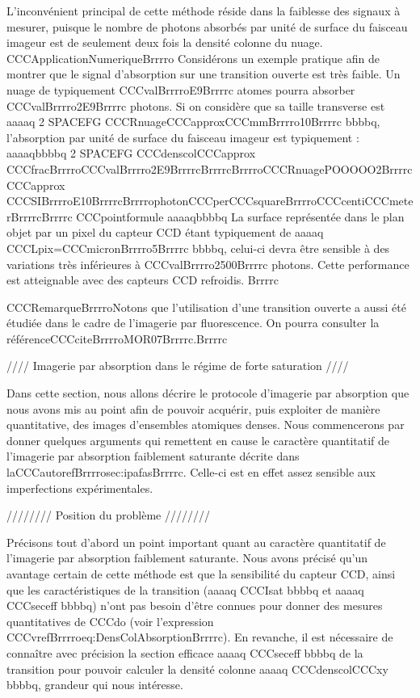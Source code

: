 L'inconvénient principal de cette méthode réside dans la faiblesse des signaux à mesurer, puisque le nombre de photons absorbés par unité de surface du faisceau imageur est de seulement deux fois la densité colonne du nuage.
CCCApplicationNumeriqueBrrrro
Considérons un exemple pratique afin de montrer que le signal d'absorption sur une transition ouverte est très faible. Un nuage de typiquement CCCvalBrrrroE9Brrrrc atomes pourra absorber CCCvalBrrrro2E9Brrrrc photons. Si on considère que sa taille transverse
est aaaaq 2 SPACEFG CCCRnuageCCCapproxCCCmmBrrrro10Brrrrc bbbbq, l'absorption par unité de surface du faisceau imageur est typiquement :
aaaaqbbbbq
2 SPACEFG CCCdenscolCCCapprox CCCfracBrrrroCCCvalBrrrro2E9BrrrrcBrrrrcBrrrroCCCRnuagePOOOOO2Brrrrc CCCapprox CCCSIBrrrroE10BrrrrcBrrrrophotonCCCperCCCsquareBrrrroCCCcentiCCCmeterBrrrrcBrrrrc
CCCpointformule
aaaaqbbbbq
La surface représentée dans le plan objet par un pixel du capteur CCD étant typiquement de aaaaq CCCLpix=CCCmicronBrrrro5Brrrrc bbbbq, celui-ci devra être sensible à des variations très inférieures à CCCvalBrrrro2500Brrrrc photons. Cette performance est atteignable avec des capteurs CCD refroidis. 
Brrrrc


CCCRemarqueBrrrroNotons que l'utilisation d'une transition ouverte a aussi été étudiée dans le cadre de l'imagerie par fluorescence. On pourra consulter la référenceCCCciteBrrrroMOR07Brrrrc.Brrrrc


//// Imagerie par absorption dans le régime de forte saturation ////

Dans cette section, nous allons décrire le protocole d'imagerie par absorption que nous avons mis au point afin de pouvoir acquérir, puis exploiter de manière quantitative, des images d'ensembles atomiques denses. 
Nous commencerons par donner quelques arguments qui remettent en cause le caractère quantitatif de l'imagerie par absorption faiblement saturante décrite dans laCCCautorefBrrrrosec:ipafasBrrrrc. Celle-ci est en effet assez sensible aux imperfections expérimentales.

//////// Position du problème ////////

Précisons tout d'abord un point important quant au caractère quantitatif de l'imagerie par absorption faiblement saturante. Nous avons précisé qu'un avantage certain de cette méthode est que la sensibilité du capteur CCD, ainsi que les caractéristiques de la transition (aaaaq CCCIsat bbbbq et aaaaq CCCseceff bbbbq) n'ont pas besoin d'être connues pour donner des mesures quantitatives de CCCdo (voir l'expression CCCvrefBrrrroeq:DensColAbsorptionBrrrrc). En revanche, il est nécessaire de connaître avec précision la section efficace aaaaq CCCseceff bbbbq de la transition pour pouvoir calculer la densité colonne aaaaq CCCdenscolCCCxy bbbbq, grandeur qui nous intéresse.




